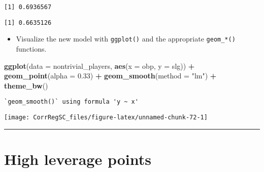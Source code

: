 \documentclass[
]{book}
\newenvironment{Shaded}{\begin{snugshade}}{\end{snugshade}}
\newcommand{\CommentTok}[1]{\textcolor[rgb]{0.56,0.35,0.01}{\textit{#1}}}
\newcommand{\DataTypeTok}[1]{\textcolor[rgb]{0.13,0.29,0.53}{#1}}
\newcommand{\FloatTok}[1]{\textcolor[rgb]{0.00,0.00,0.81}{#1}}
\newcommand{\KeywordTok}[1]{\textcolor[rgb]{0.13,0.29,0.53}{\textbf{#1}}}
\newcommand{\NormalTok}[1]{#1}
\newcommand{\OperatorTok}[1]{\textcolor[rgb]{0.81,0.36,0.00}{\textbf{#1}}}
\newcommand{\StringTok}[1]{\textcolor[rgb]{0.31,0.60,0.02}{#1}}
\providecommand{\tightlist}{%
  \setlength{\itemsep}{0pt}\setlength{\parskip}{0pt}}
\begin{document}
\begin{verbatim}
[1] 0.6936567
\end{verbatim}

\begin{Shaded}
\end{Shaded}

\begin{verbatim}
[1] 0.6635126
\end{verbatim}

\begin{itemize}
\tightlist
\item
  Visualize the new model with \texttt{ggplot()} and the appropriate \texttt{geom\_*()} functions.
\end{itemize}

\begin{Shaded}
\begin{Highlighting}[]
\KeywordTok{ggplot}\NormalTok{(}\DataTypeTok{data =}\NormalTok{ nontrivial_players, }\KeywordTok{aes}\NormalTok{(}\DataTypeTok{x =}\NormalTok{ obp, }\DataTypeTok{y =}\NormalTok{ slg)) }\OperatorTok{+}
\StringTok{  }\KeywordTok{geom_point}\NormalTok{(}\DataTypeTok{alpha =} \FloatTok{0.33}\NormalTok{) }\OperatorTok{+}\StringTok{ }
\StringTok{  }\KeywordTok{geom_smooth}\NormalTok{(}\DataTypeTok{method =} \StringTok{"lm"}\NormalTok{) }\OperatorTok{+}\StringTok{ }
\StringTok{  }\KeywordTok{theme_bw}\NormalTok{()}
\end{Highlighting}
\end{Shaded}

\begin{verbatim}
`geom_smooth()` using formula 'y ~ x'
\end{verbatim}

\begin{center}\texttt{[image: CorrRegSC\_files/figure-latex/unnamed-chunk-72-1]} \end{center}

\begin{center}\rule{0.5\linewidth}{0.5pt}\end{center}

\hypertarget{high-leverage-points}{%
\section{High leverage points}\label{high-leverage-points}}
\end{document}
